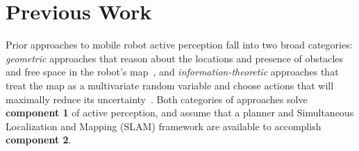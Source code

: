 \begin{center}  \end{center}



\section{Previous Work}

Prior approaches to mobile robot active perception fall into two
broad categories: \textit{geometric} approaches that reason about the locations and
presence of obstacles and free space in the robot's
map~\cite{acar2002sensor,chan1993line,wang2007view,
burgard2000collaborative,taylor1993exploration,yamauchi1997frontier}, and
\textit{information-theoretic} approaches that treat the map as
a multivariate random variable and choose actions that will maximally reduce its
uncertainty~\cite{amigoni2010information,bourgault2002information,charrow2015icra,
julian2013mutual,feder1999adaptive}. Both categories of approaches solve {\bf
component 1} of active perception, and assume that a planner and Simultaneous
Localization and Mapping (SLAM) framework are available to accomplish {\bf
component 2}.

